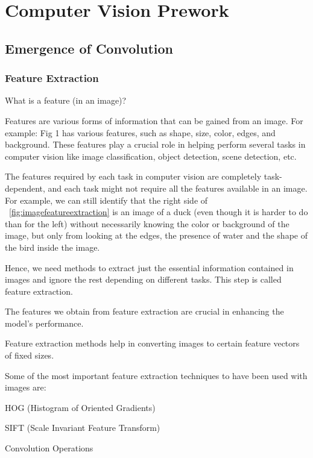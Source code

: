 	\chapter{Computer Vision Prework}

	\section{Emergence of Convolution}
	\subsection{Feature Extraction}
	\begin{bulletedlist}
		\item What is a feature (in an image)?
		\begin{bulletedlist}
			\item Features are various forms of information that can be gained from an image.  For example: Fig 1 has various features, such as shape, size, color, edges, and background.  These features play a crucial role in helping perform several tasks in computer vision like image classification, object detection, scene detection, etc.
		\end{bulletedlist}
		\item The features required by each task in computer vision are completely task-dependent, and each task might not require all the features available in an image.  For example, we can still identify that the right side of \figurename~\ref{fig:imagefeatureextraction} is an image of a duck (even though it is harder to do than for the left) without necessarily knowing the color or background of the image, but only from looking at the edges, the presence of water and the shape of the bird inside the image.
		\item Hence, we need methods to extract just the essential information contained in images and ignore the rest depending on different tasks. This step is called feature extraction.
		\item The features we obtain from feature extraction are crucial in enhancing the model's performance.
		\item Feature extraction methods help in converting images to certain feature vectors of fixed sizes.
		\item Some of the most important feature extraction techniques to have been used with images are:
		\begin{bulletedlist}
			\item HOG (Histogram of Oriented Gradients)
			\item SIFT (Scale Invariant Feature Transform)
			\item Convolution Operations
		\end{bulletedlist}
	\end{bulletedlist}

